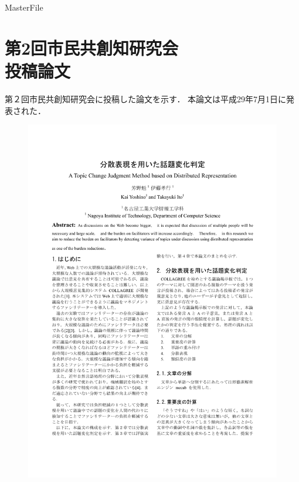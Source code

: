 \expandafter\ifx\csname MasterFile\endcsname\relax
\def\SubFile{hoge}


\fi
\cleardoublepage
\chapter[市民共創知研究会 投稿論文]{第2回市民共創知研究会\\投稿論文}
第２回市民共創知研究会に投稿した論文を示す．
本論文は平成29年7月1日に発表された．

\begin{figure}
	\centering
	\includegraphics[width=\linewidth,page=1]{../B.SIG-CCI2/yoshino-paper6.pdf}
\end{figure}

